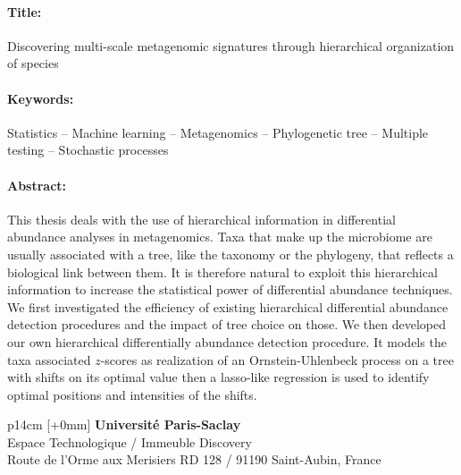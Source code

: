 \documentclass[12pt,a4paper]{reedthesis}
\theoremstyle{definition}
\theoremstyle{definition}
\theoremstyle{definition}
\theoremstyle{remark}
\begin{document}
\begin{mdframed}[linecolor=Prune,linewidth=1]
\vspace{-.25cm}
\paragraph*{Title:} Discovering multi-scale metagenomic signatures through hierarchical organization of species
\begin{small}
\vspace{-.25cm}
\paragraph*{Keywords:} Statistics -- Machine learning -- Metagenomics -- Phylogenetic tree -- Multiple testing -- Stochastic processes

\vspace{-.5cm}
\begin{multicols}{2}
\paragraph*{Abstract:} This thesis deals with the use of hierarchical information in differential abundance
analyses in metagenomics. Taxa that make up the microbiome are
usually associated with a tree, like the taxonomy or the phylogeny, that reflects a
biological link between them. It is therefore natural to exploit this hierarchical
information to increase the statistical power of differential abundance techniques.
We first investigated the efficiency of existing hierarchical
differential abundance detection procedures and the impact of tree choice
on those. We then developed our own hierarchical differentially
abundance detection procedure. It models the taxa associated \(z\)-scores as realization
of an Ornstein-Uhlenbeck process on a tree with shifts on its optimal value
then a lasso-like regression is used to identify optimal positions and intensities
of the shifts. \newline
\end{multicols}
\end{small}
\end{mdframed}

\vfill
{}\selectfont
\noindent\begin{tabular}{p{14cm}}
[+0mm]{\small {\color{Prune} {\bf Université Paris-Saclay}\\
{\scriptsize Espace Technologique / Immeuble Discovery}\\
{\scriptsize  Route de l’Orme aux Merisiers RD 128 / 91190 Saint-Aubin, France}}}\\\mbox{}
\end{tabular}

\end{document}
